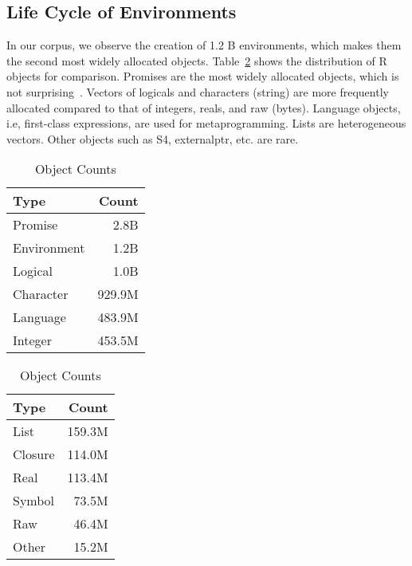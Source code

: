 \documentclass[10pt,review,sigplan,anonymous=true,authorversion=true,nonacm=true]{acmart}
\begin{document}
\subsection{Life Cycle of Environments}
In our corpus, we observe the creation of 1.2 B environments, which makes them
the second most widely allocated objects. Table~\ref{table:object_count_dist}
shows the distribution of R objects for comparison. Promises are the most widely
allocated objects, which is not surprising~\cite{oopsla19b}. Vectors of logicals
and characters (string) are more frequently allocated compared to that of
integers, reals, and raw (bytes). Language objects, i.e, first-class
expressions, are used for metaprogramming. Lists are heterogeneous vectors.
Other objects such as S4, externalptr, etc. are rare.

\begin{table}
  \vspace{-3mm}
  \small
  \caption{Object Counts} \label{table:object_count_dist}
  \centering
  \begin{tabular}{lr}
    \toprule
    \textbf{Type}&\textbf{Count}\\
    \midrule
    Promise&2.8B\\
    Environment&1.2B\\
    Logical&1.0B\\
    Character&929.9M\\
    Language&483.9M\\
    Integer&453.5M\\
    \bottomrule
  \end{tabular}
  \begin{tabular}{lr}
    \toprule
    \textbf{Type}&\textbf{Count}\\
    \midrule
    List&159.3M\\
    Closure&114.0M\\
    Real&113.4M\\
    Symbol&73.5M\\
    Raw&46.4M\\
    Other&15.2M\\
    \bottomrule
  \end{tabular}
\end{table}
\end{document}
